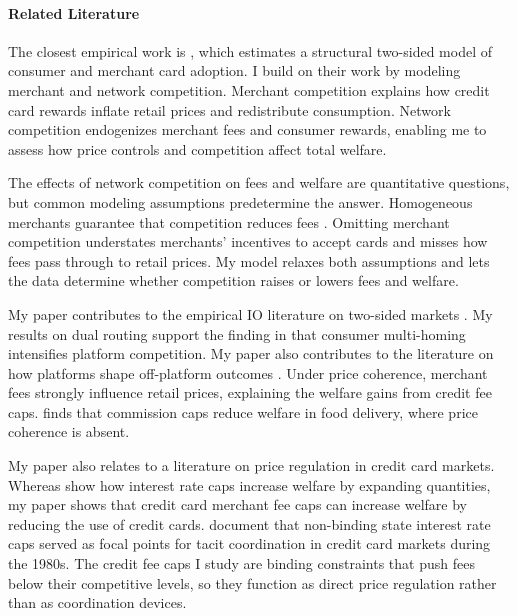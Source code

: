 \documentclass[main.tex]{subfiles}
\begin{document}
\paragraph{Related Literature}

The closest empirical work is \textcite*{Huynh.etal2022}, which estimates a structural two-sided model of consumer and merchant card adoption.
I build on their work by modeling merchant and network competition.
Merchant competition explains how credit card rewards inflate retail prices and redistribute consumption.
Network competition endogenizes merchant fees and consumer rewards, enabling me to assess how price controls and competition affect total welfare.

The effects of network competition on fees and welfare are quantitative questions, but common modeling assumptions predetermine the answer.
Homogeneous merchants guarantee that competition reduces fees \parencite{Guthrie.Wright2007}.
Omitting merchant competition understates merchants' incentives to accept cards \parencite{Rochet.Tirole2002, Wright2012, Li.etal2020} and misses how fees pass through to retail prices.
My model relaxes both assumptions and lets the data determine whether competition raises or lowers fees and welfare.

My paper contributes to the empirical IO literature on two-sided markets \parencite{Rysman2004, Lee2013, Song2021}.
My results on dual routing support the finding in \textcite{Rosaia2020} that consumer multi-homing intensifies platform competition.
My paper also contributes to the literature on how platforms shape off-platform outcomes \parencite{Bergemann.etal2024, Chen2024, Bursztyn.etal2025}.
Under price coherence, merchant fees strongly influence retail prices, explaining the welfare gains from credit fee caps.
\textcite{Sullivan2025} finds that commission caps reduce welfare in food delivery, where price coherence is absent.

My paper also relates to a literature on price regulation in credit card markets.
Whereas \textcite{Nelson2020,Cuesta.Sepulveda2021} show how interest rate caps increase welfare by expanding quantities, my paper shows that credit card merchant fee caps can increase welfare by reducing the use of credit cards.
\textcite{Knittel.Stango2003} document that non-binding state interest rate caps served as focal points for tacit coordination in credit card markets during the 1980s.
The credit fee caps I study are binding constraints that push fees below their competitive levels, so they function as direct price regulation rather than as coordination devices.
\end{document}
